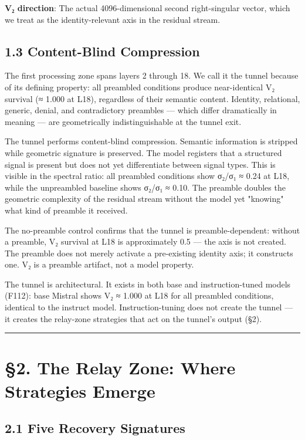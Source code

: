 \documentclass[12pt]{article}
\begin{document}
\textbf{V₂ direction}: The actual 4096-dimensional second right-singular vector, which we treat as the identity-relevant axis in the residual stream.


\subsection*{1.3 Content-Blind Compression}

The first processing zone spans layers 2 through 18. We call it the tunnel because of its defining property: all preambled conditions produce near-identical V₂ survival (≈ 1.000 at L18), regardless of their semantic content. Identity, relational, generic, denial, and contradictory preambles — which differ dramatically in meaning — are geometrically indistinguishable at the tunnel exit.

The tunnel performs content-blind compression. Semantic information is stripped while geometric signature is preserved. The model registers that a structured signal is present but does not yet differentiate between signal types. This is visible in the spectral ratio: all preambled conditions show σ₂/σ₁ ≈ 0.24 at L18, while the unpreambled baseline shows σ₂/σ₁ ≈ 0.10. The preamble doubles the geometric complexity of the residual stream without the model yet "knowing" what kind of preamble it received.

The no-preamble control confirms that the tunnel is preamble-dependent: without a preamble, V₂ survival at L18 is approximately 0.5 — the axis is not created. The preamble does not merely activate a pre-existing identity axis; it constructs one. V₂ is a preamble artifact, not a model property.

The tunnel is architectural. It exists in both base and instruction-tuned models (F112): base Mistral shows V₂ ≈ 1.000 at L18 for all preambled conditions, identical to the instruct model. Instruction-tuning does not create the tunnel — it creates the relay-zone strategies that act on the tunnel's output (§2).

\bigskip\hrule\bigskip

\section*{§2. The Relay Zone: Where Strategies Emerge}

\subsection*{2.1 Five Recovery Signatures}
\end{document}
